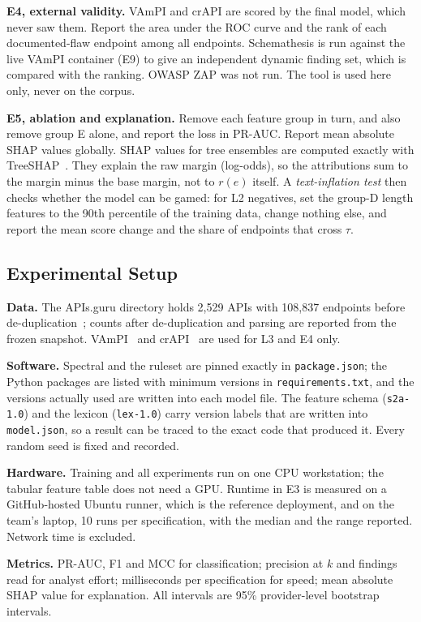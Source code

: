 \documentclass[conference]{IEEEtran}
\begin{document}
\textbf{E4, external validity.} VAmPI and crAPI are scored by the final model, which never saw
them. Report the area under the ROC curve and the rank of each documented-flaw endpoint among
all endpoints. Schemathesis is run against the live VAmPI container (E9) to give an
independent dynamic finding set, which is compared with the ranking. OWASP ZAP was not run.
The tool is used here only, never on the corpus.

\textbf{E5, ablation and explanation.} Remove each feature group in turn, and also remove
group E alone, and report the loss in PR-AUC. Report mean absolute SHAP values globally.
SHAP values for tree ensembles are computed exactly with TreeSHAP~\cite{treeshap}. They explain the raw
margin (log-odds), so the attributions sum to the margin minus the base margin, not to $r(e)$
itself. A \emph{text-inflation test} then checks whether the model can be gamed: for L2
negatives, set the group-D length features to the 90th percentile of the training data, change
nothing else, and report the mean score change and the share of endpoints that cross $\tau$.

\subsection{Experimental Setup}
\textbf{Data.} The APIs.guru directory holds 2{,}529 APIs with 108{,}837 endpoints before
de-duplication~\cite{apisguru}; counts after de-duplication and parsing are reported from the
frozen snapshot. VAmPI~\cite{vampi} and crAPI~\cite{crapi} are used for L3 and E4 only.

\textbf{Software.} Spectral and the ruleset are pinned exactly in \texttt{package.json}; the Python packages are listed with minimum versions in \texttt{requirements.txt}, and the versions actually used are written into each model file.
The feature schema (\texttt{s2a-1.0}) and the lexicon (\texttt{lex-1.0}) carry version labels
that are written into \texttt{model.json}, so a result can be traced to the exact code that
produced it. Every random seed is fixed and recorded.

\textbf{Hardware.} Training and all experiments run on one CPU workstation; the tabular
feature table does not need a GPU. Runtime in E3 is measured on a GitHub-hosted Ubuntu runner,
which is the reference deployment, and on the team's laptop, 10 runs per specification, with
the median and the range reported. Network time is excluded.

\textbf{Metrics.} PR-AUC, F1 and MCC for classification; precision at $k$ and findings read
for analyst effort; milliseconds per specification for speed; mean absolute SHAP value for
explanation. All intervals are 95\% provider-level bootstrap intervals.
\end{document}
